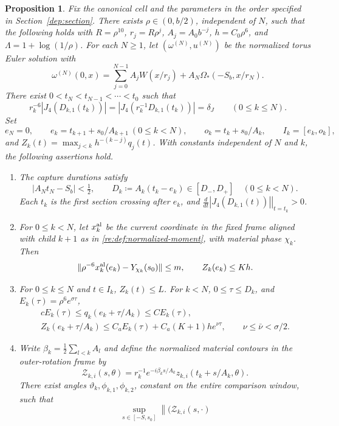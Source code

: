 \documentclass[11pt]{amsart}
\newtheorem{proposition}[theorem]{Proposition}
\theoremstyle{remark}
\numberwithin{equation}{section}
\begin{document}
\begin{proposition}
\label{fi:finite}
Fix the canonical cell and the parameters in the order specified in
Section~\ref{dep:section}. There exists $\rho\in(0,b/2)$,
independent of $N$, such that the following holds with
$R=\rho^{10}$, $r_j=R\rho^j$, $A_j=A_0b^{-j}$,
$h=C_0\rho^6$, and $\Lambda=1+\log(1/\rho)$.
For each $N\ge1$, let $(\omega^{(N)},u^{(N)})$ be the normalized
torus Euler solution with
\[
 \omega^{(N)}(0,x)=\sum_{j=0}^{N-1}A_jW(x/r_j)
                      +A_N\Omega_*(-S_b,x/r_N).
\]
There exist $0<t_N<t_{N-1}<\cdots<t_0$ such that
\begin{equation}\label{fi:normalized-section}
 r_k^{-6}|J_4(D_{k,1}(t_k))|
       =|J_4(r_k^{-1}D_{k,1}(t_k))|=\delta_J
 \qquad(0\le k\le N).
\end{equation}
Set
\[
 e_N=0,\qquad e_k=t_{k+1}+s_0/A_{k+1}\ (0\le k<N),\qquad
 o_k=t_k+s_0/A_k,\qquad I_k=[e_k,o_k],
\]
and $Z_k(t)=\max_{j<k}h^{-(k-j)}q_j(t)$. With constants independent
of $N$ and $k$, the following assertions hold.
\begin{enumerate}
\item The capture durations satisfy
\[
 |A_Nt_N-S_b|<\tfrac12,\qquad
 D_k\coloneqq A_k(t_k-e_k)\in[D_-,D_+]
       \quad(0\le k<N).
\]
Each $t_k$ is the first section crossing after $e_k$, and
$\left.\frac{d}{dt}|J_4(D_{k,1}(t))|\right|_{t=t_k}>0$.
\item For $0\le k<N$, let $x_k^{\rm al}$ be the current coordinate
in the fixed frame aligned with child $k+1$ as in
\eqref{re:def:normalized-moment}, with material phase $\chi_k$.
Then
\[
 \|\rho^{-6}x_k^{\rm al}(e_k)-Y_{\chi_k}(s_0)\|\le m,\qquad
 Z_k(e_k)\le Kh.
\]
\item For $0\le k\le N$ and $t\in I_k$, $Z_k(t)\le L$.
For $k<N$, $0\le\tau\le D_k$, and
$E_k(\tau)=\rho^6e^{\sigma\tau}$,
\[
 \begin{gathered}
 cE_k(\tau)\le q_k(e_k+\tau/A_k)\le CE_k(\tau),\\
 Z_k(e_k+\tau/A_k)
       \le C_aE_k(\tau)+C_a(K+1)he^{\nu\tau},\qquad
 \nu\le\bar\nu<\sigma/2.
 \end{gathered}
\]
\item Write $\beta_k=\tfrac12\sum_{l<k}A_l$ and define the
normalized material contours in the outer-rotation frame by
\[
 \mathcal Z_{k,i}(s,\theta)=r_k^{-1}e^{-i\beta_ks/A_k}
       z_{k,i}(t_k+s/A_k,\theta).
\]
There exist angles $\vartheta_k,\phi_{k,1},\phi_{k,2}$, constant
on the entire comparison window, such that
\[
 \sup_{s\in[-S,s_0]}
 \left\|\bigl(\mathcal Z_{k,i}(s,\cdot)
\]
\end{enumerate}
\end{proposition}
\end{document}
